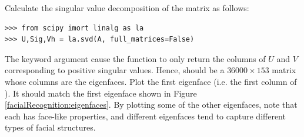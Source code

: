 \begin{problem}
\label{prob:svd}
Calculate the singular value decomposition of the matrix  as follows:
\begin{lstlisting}
>>> from scipy imort linalg as la
>>> U,Sig,Vh = la.svd(A, full_matrices=False)
\end{lstlisting}
The keyword argument  cause the function to only return the columns of $U$ and $V$ corresponding
to positive singular values. Hence,  should be a $36000\times 153$ matrix whose columns are the eigenfaces.
Plot the first eigenface (i.e. the first column of ).
It should match the first eigenface shown in Figure \ref{facialRecognition:eigenfaces}.
By plotting some of the other eigenfaces, note that each has face-like properties, and different eigenfaces tend to capture different
types of facial structures.
\end{problem}

